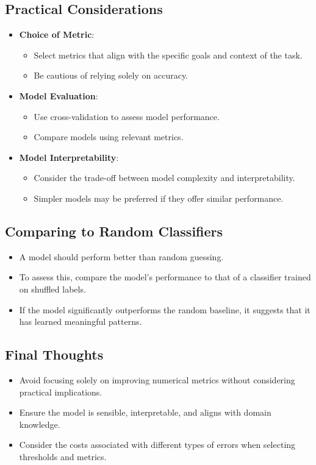 \documentclass{article}
\begin{document}
\subsection{Practical Considerations}

\begin{itemize}
    \item \textbf{Choice of Metric}:
    \begin{itemize}
        \item Select metrics that align with the specific goals and context of the task.
        \item Be cautious of relying solely on accuracy.
    \end{itemize}
    \item \textbf{Model Evaluation}:
    \begin{itemize}
        \item Use cross-validation to assess model performance.
        \item Compare models using relevant metrics.
    \end{itemize}
    \item \textbf{Model Interpretability}:
    \begin{itemize}
        \item Consider the trade-off between model complexity and interpretability.
        \item Simpler models may be preferred if they offer similar performance.
    \end{itemize}
\end{itemize}

\subsection{Comparing to Random Classifiers}

\begin{itemize}
    \item A model should perform better than random guessing.
    \item To assess this, compare the model's performance to that of a classifier trained on shuffled labels.
    \item If the model significantly outperforms the random baseline, it suggests that it has learned meaningful patterns.
\end{itemize}

\subsection{Final Thoughts}

\begin{itemize}
    \item Avoid focusing solely on improving numerical metrics without considering practical implications.
    \item Ensure the model is sensible, interpretable, and aligns with domain knowledge.
    \item Consider the costs associated with different types of errors when selecting thresholds and metrics.
\end{itemize}
\end{document}
